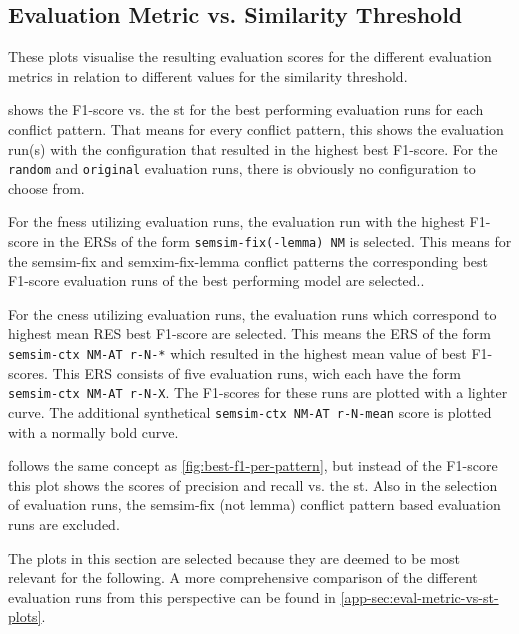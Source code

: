 \documentclass[11pt]{scrreprt}
\begin{document}
{\subsection{Evaluation Metric vs. Similarity Threshold}
\label{sec:eval-metrics-vs-st}

These plots visualise the resulting evaluation scores for the different evaluation metrics in relation to different values for the similarity threshold. 

 shows the F1-score vs. the \gls{st} for the best performing evaluation runs for each conflict pattern. That means for every conflict pattern, this shows the evaluation run(s) with the configuration that resulted in the highest best F1-score. For the \texttt{random} and \texttt{original} evaluation runs, there is obviously no configuration to choose from. 

For the \gls{fness} utilizing evaluation runs, the evaluation run with the highest F1-score in the ERSs of the form \texttt{semsim-fix(-lemma) NM} is selected. This means for the semsim-fix and semxim-fix-lemma conflict patterns the corresponding best F1-score evaluation runs of the best performing model are selected..

For the \gls{cness} utilizing evaluation runs, the evaluation runs which correspond to highest mean RES best F1-score are selected. This means the ERS of the form \texttt{semsim-ctx NM-AT r-N-*} which resulted in the highest mean value of best F1-scores. This ERS consists of five evaluation runs, wich each have the form \texttt{semsim-ctx NM-AT r-N-X}. The F1-scores for these runs are plotted with a lighter curve. The additional synthetical \texttt{semsim-ctx NM-AT r-N-mean} score is plotted with a normally bold curve. 


 follows the same concept as \cref{fig:best-f1-per-pattern}, but instead of the F1-score this plot shows the scores of precision and recall vs. the \gls{st}. Also in the selection of evaluation runs, the semsim-fix (not lemma) conflict pattern based evaluation runs are excluded.

The plots in this section are selected because they are deemed to be most relevant for the following. A more comprehensive comparison of the different evaluation runs from this perspective can be found in \cref{app-sec:eval-metric-vs-st-plots}.

}
\end{document}
